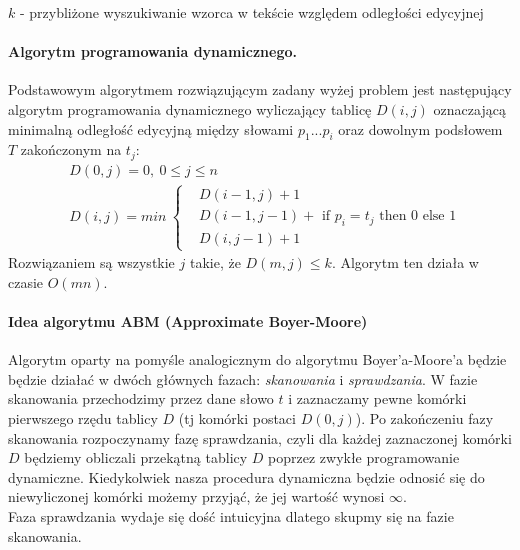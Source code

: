 \begin{algorithm}[H]
    \caption{$k$ - przybliżone wyszukiwanie wzorca w tekście względem odległości edycyjnej}
\end{algorithm}

\paragraph{Algorytm programowania dynamicznego.}
Podstawowym algorytmem rozwiązującym zadany wyżej problem jest następujący algorytm programowania dynamicznego wyliczający tablicę $D(i,j)$ oznaczającą minimalną odległość edycyjną między słowami $p_1...p_i$ oraz dowolnym podsłowem $T$ zakończonym na $t_j$:
\begin{align*}
    & D(0,j) = 0,\ 0 \leq j \leq n \\
    & D(i, j) = min\ \left\{\begin{array}{ll}
         &  D(i-1,j)+1\\
         &  D(i-1,j-1) + \text{ if } p_i = t_j \text{ then } 0 \text{ else } 1 \\
         &  D(i, j-1)+1
    \end{array} \right.
\end{align*}
Rozwiązaniem są wszystkie $j$ takie, że $D(m,j) \leq k$. Algorytm ten działa w czasie $O(mn)$.

\paragraph{Idea algorytmu ABM (Approximate Boyer-Moore)}

Algorytm oparty na pomyśle analogicznym do algorytmu Boyer'a-Moore'a będzie będzie działać w dwóch głównych fazach: \textit{skanowania} i \textit{sprawdzania}. 
W fazie skanowania przechodzimy przez dane słowo $t$ i zaznaczamy pewne komórki pierwszego rzędu tablicy $D$ (tj komórki postaci $D(0,j)$). 
Po zakończeniu fazy skanowania rozpoczynamy fazę sprawdzania, czyli dla każdej zaznaczonej komórki $D$ będziemy obliczali przekątną tablicy $D$ poprzez zwykłe programowanie dynamiczne. 
Kiedykolwiek nasza procedura dynamiczna będzie odnosić się do niewyliczonej komórki możemy przyjąć, że jej wartość wynosi $\infty.$\\
Faza sprawdzania wydaje się dość intuicyjna dlatego skupmy się na fazie skanowania.\\

